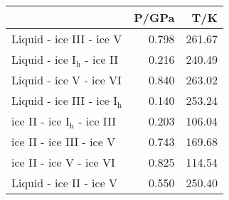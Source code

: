 \begin{tabular}{lrr}
\hline\hline
&P/GPa&T/K\\
\hline
Liquid - ice III - ice V&0.798&261.67\\
Liquid - ice I$_{\mathrm h}$ - ice II&0.216&240.49\\
Liquid - ice V - ice VI&0.840&263.02\\
Liquid - ice III - ice I$_{\mathrm h}$&0.140&253.24\\
ice II - ice I$_{\mathrm h}$ - ice III&0.203&106.04\\
ice II - ice III - ice V&0.743&169.68\\
ice II - ice V - ice VI&0.825&114.54\\
Liquid - ice II - ice V&0.550&250.40\\
\hline\hline
\end{tabular}